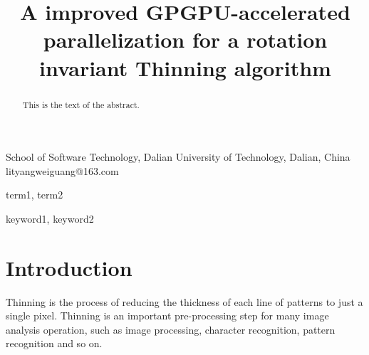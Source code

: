 \documentclass{sigplanconf}
\begin{document}
\setlength{\pdfpageheight}{\paperheight}
\setlength{\pdfpagewidth}{\paperwidth}






\title{A improved GPGPU-accelerated parallelization for a rotation invariant Thinning algorithm}

           {School of Software Technology, Dalian University of Technology, Dalian, China}
           {lityangweiguang@163.com}

\maketitle

\begin{abstract}
This is the text of the abstract.
\end{abstract}


\terms
term1, term2

\keywords
keyword1, keyword2

\section{Introduction}

Thinning is the process of reducing the thickness of each line of patterns to just a single pixel. Thinning is an important pre-processing step for many image analysis operation, such as image processing, character recognition, pattern recognition and so on.
\end{document}
